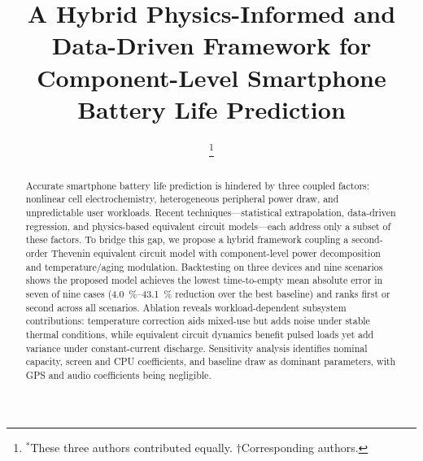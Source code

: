 \documentclass[conference]{IEEEtran}
\begin{document}
\title{A Hybrid Physics-Informed and Data-Driven Framework for Component-Level Smartphone Battery Life Prediction}

\author{
\thanks{$^*$These three authors contributed equally. $\dagger$Corresponding authors.}
\\
}

\maketitle

\begin{abstract}
Accurate smartphone battery life prediction is hindered by three coupled factors: nonlinear cell electrochemistry, heterogeneous peripheral power draw, and unpredictable user workloads. Recent techniques---statistical extrapolation, data-driven regression, and physics-based equivalent circuit models---each address only a subset of these factors. To bridge this gap, we propose a hybrid framework coupling a second-order Thevenin equivalent circuit model with component-level power decomposition and temperature/aging modulation. Backtesting on three devices and nine scenarios shows the proposed model achieves the lowest time-to-empty mean absolute error in seven of nine cases (\SI{4.0}{\percent}--\SI{43.1}{\percent} reduction over the best baseline) and ranks first or second across all scenarios. Ablation reveals workload-dependent subsystem contributions: temperature correction aids mixed-use but adds noise under stable thermal conditions, while equivalent circuit dynamics benefit pulsed loads yet add variance under constant-current discharge. Sensitivity analysis identifies nominal capacity, screen and CPU coefficients, and baseline draw as dominant parameters, with GPS and audio coefficients being negligible.
\end{abstract}
\end{document}
